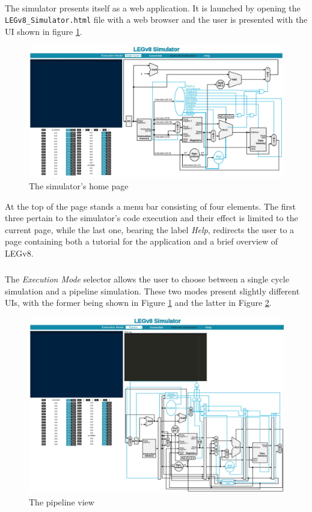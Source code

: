 \paragraph{}
The simulator presents itself as a web application. It is launched by opening the \verb|LEGv8_Simulator.html| file with a web browser and the user is presented with the UI shown in figure \ref{fig:ogsimhomepage}.
\begin{figure}[H]
    \centering
    \includegraphics[width=1\linewidth]{img/old_single_cycle.jpeg}
    \caption{The simulator's home page}
    \label{fig:ogsimhomepage}
\end{figure}
At the top of the page stands a menu bar consisting of four elements. The first three pertain to the simulator's code execution and their effect is limited to the current page, while the last one, bearing the label \emph{Help}, redirects the user to a page containing both a tutorial for the application and a brief overview of LEGv8.
\subparagraph{}
The \emph{Execution Mode} selector allows the user to choose between a single cycle simulation and a pipeline simulation. These two modes present slightly different UIs, with the former being shown in Figure \ref{fig:ogsimhomepage} and the latter in Figure \ref{fig:ogpipelineview}.
\begin{figure}[H]
    \centering
    \includegraphics[width=1\linewidth]{img/old_pipeline.jpeg}
    \caption{The pipeline view}
    \label{fig:ogpipelineview}
\end{figure}
